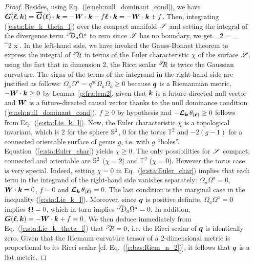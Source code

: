 \begin{proof}
Besides, using Eq.~(\ref{e:neh:null_dominant_cond}), we have
$\bm{G}(\bm{\ell}, \bm{k}) = \overrightarrow{\bm{G}}(\bm{\ell})\cdot\bm{k} = - \bm{W}\cdot\bm{k} - f \bm{\ell}\cdot \bm{k} = - \bm{W}\cdot\bm{k} + f$.
Then, integrating (\ref{e:sta:Lie_k_theta_l}) over the compact manifold $\mathscr{S}$
and setting the integral of the divergence term ${}^{\mathscr{S}}\!\!D_a \Omega^a$ to zero since
$\mathscr{S}$ has no boundary, we get
\be \label{e:sta:Euler_char}
    _{2\pi\chi} = \int_\Sp {}
           \, \D^2 x .
\ee
In the left-hand side, we have invoked the Gauss-Bonnet theorem
to express the integral of ${}^{\mathscr{S}}\!\! R$ in terms
of the Euler characteristic $\chi$ of the
surface $\mathscr{S}$, using the fact that in dimension 2,
the Ricci scalar ${}^{\mathscr{S}}\!\! R$ is twice the
Gaussian curvature.
The signs of the terms of the integrand in the right-hand side
are justified as follows:
$\Omega_a \Omega^a = q^{ab} \Omega_a \Omega_b \geq 0$ because $\bm{q}$ is a Riemannian metric,
$- \bm{W}\cdot\bm{k} \geq 0$ by Lemma~\ref{p:fra:lem2},
given that $\bm{k}$ is a future-directed null vector and $\bm{W}$ is a future-directed
causal vector thanks to the null dominance condition (\ref{e:neh:null_dominant_cond}),
$f\geq 0$ by hypothesis and $- \bm{\mathcal{L}}_{\bm{k}}\, \theta_{(\bm{\ell})} \geq 0$
follows from Eq.~(\ref{e:sta:Lie_k_l}). Now, the Euler characteristic $\chi$ is a topological
invariant, which is $2$ for the sphere $\mathbb{S}^2$, $0$ for the torus $\mathbb{T}^2$
and $-2(g-1)$
for a connected orientable surface of genus $g$, i.e. with $g$ ``holes''.
Equation~(\ref{e:sta:Euler_char}) yields $\chi \geq 0$.
The only possibilities for $\mathscr{S}$ compact, connected and orientable
are $\mathbb{S}^2$ ($\chi = 2$) and $\mathbb{T}^2$ ($\chi = 0$).
However the torus case is very special. Indeed, setting $\chi=0$ in Eq.~(\ref{e:sta:Euler_char})
implies that each term in the integrand of the right-hand side vanishes separately:
$\Omega_a \Omega^a = 0$, $\bm{W}\cdot\bm{k} = 0$, $f=0$ and $\bm{\mathcal{L}}_{\bm{k}}\, \theta_{(\bm{\ell})} = 0$.
The last condition is the marginal case in the inequality (\ref{e:sta:Lie_k_l}). Moreover,
since $\bm{q}$ is positive definite, $\Omega_a \Omega^a = 0$ implies $\bm{\Omega} = 0$,
which in turn implies ${}^{\mathscr{S}}\!\!D_a \Omega^a = 0$. In addition,
$\bm{G}(\bm{\ell}, \bm{k}) = - \bm{W}\cdot\bm{k} + f = 0$. We then deduce immediately from
Eq.~(\ref{e:sta:Lie_k_theta_l}) that ${}^{\mathscr{S}}\!\! R = 0$, i.e.
the Ricci scalar of $\bm{q}$ is identically zero. Given that the Riemann
curvature tensor of a 2-dimensional metric is proportional to its
Ricci scalar [cf. Eq.~(\ref{e:bas:Riem_n_2})], it follows that $\bm{q}$
is a flat metric.
\end{proof}

